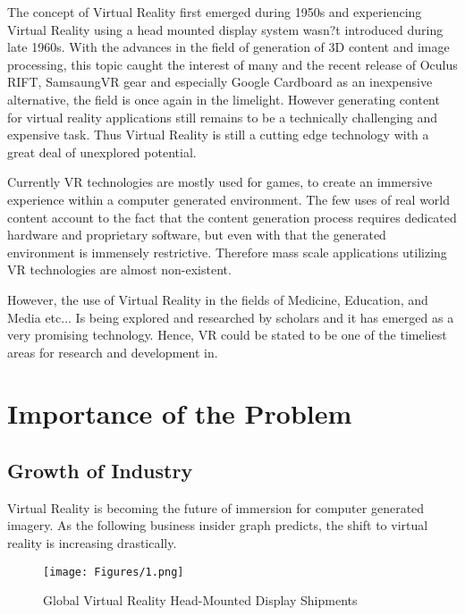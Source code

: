 The concept of Virtual Reality first emerged during 1950s and experiencing Virtual Reality using a head mounted display system wasn?t introduced during late 1960s. With the advances in the field of generation of 3D content and image processing, this topic caught the interest of many and the recent release of Oculus RIFT, SamsaungVR gear and especially Google Cardboard as an inexpensive alternative, the field is once again in the limelight. However generating content for virtual reality applications still remains to be a technically challenging and expensive task. Thus Virtual Reality is still a cutting edge technology with a great deal of unexplored potential.

Currently VR technologies are mostly used for games, to create an immersive experience within a computer generated environment. The few uses of real world content account to the fact that the content generation process requires dedicated hardware and proprietary software, but even with that the generated environment is immensely restrictive. Therefore mass scale applications utilizing VR technologies are almost non-existent.

However, the use of Virtual Reality in the fields of Medicine, Education, and Media etc... Is being explored and researched by scholars and it has emerged as a very promising technology. Hence, VR could be stated to be one of the timeliest areas for research and development in.

\section{Importance of the Problem}
\label{intro_sec:2}

\subsection{Growth of Industry}
\label{intro_subsec:2_1}

Virtual Reality is becoming the future of immersion for computer generated imagery. As the following business insider graph predicts, the shift to virtual reality is increasing drastically.

\begin{figure}[htbp]
\begin{center}
\texttt{[image: Figures/1.png]}
\caption{Global Virtual Reality Head-Mounted Display Shipments \cite{1}}
\label{fig1_1}
\end{center}
\end{figure}


